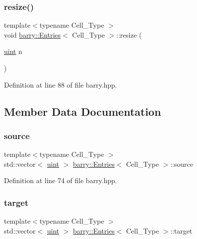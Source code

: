 \subsubsection{\texorpdfstring{resize()}{resize()}}
{\footnotesize\ttfamily template$<$typename Cell\+\_\+\+Type $>$ \\
void \hyperlink{classbarry_1_1_entries}{barry\+::\+Entries}$<$ Cell\+\_\+\+Type $>$\+::resize (\begin{DoxyParamCaption}\item[{\hyperlink{namespacebarry_a11dfc53ddb4672278319aa04f1e09a6c}{uint}}]{n }\end{DoxyParamCaption})\hspace{0.3cm}{\ttfamily [inline]}}



Definition at line 88 of file barry.\+hpp.



\subsection{Member Data Documentation}
\mbox{\label{classbarry_1_1_entries_a5992282ca5f39dbbbd4195d7176b6295}} 
\subsubsection{\texorpdfstring{source}{source}}
{\footnotesize\ttfamily template$<$typename Cell\+\_\+\+Type $>$ \\
std\+::vector$<$ \hyperlink{namespacebarry_a11dfc53ddb4672278319aa04f1e09a6c}{uint} $>$ \hyperlink{classbarry_1_1_entries}{barry\+::\+Entries}$<$ Cell\+\_\+\+Type $>$\+::source}



Definition at line 74 of file barry.\+hpp.

\mbox{\label{classbarry_1_1_entries_a07de39535af23bc1f9e3918b32a39b18}} 
\subsubsection{\texorpdfstring{target}{target}}
{\footnotesize\ttfamily template$<$typename Cell\+\_\+\+Type $>$ \\
std\+::vector$<$ \hyperlink{namespacebarry_a11dfc53ddb4672278319aa04f1e09a6c}{uint} $>$ \hyperlink{classbarry_1_1_entries}{barry\+::\+Entries}$<$ Cell\+\_\+\+Type $>$\+::target}



